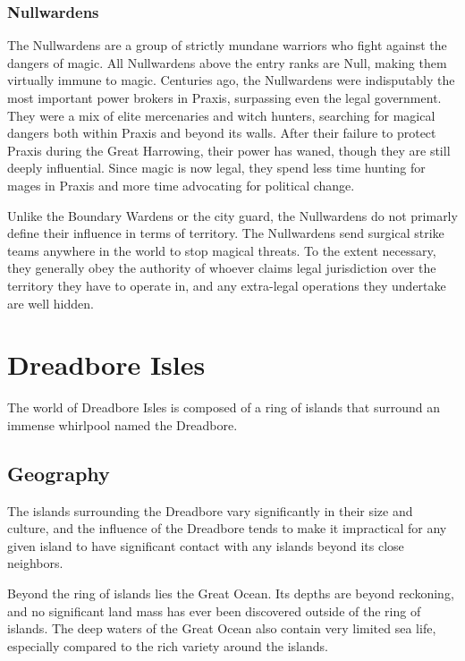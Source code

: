     \subsubsection{Nullwardens}
      The Nullwardens are a group of strictly mundane warriors who fight against the dangers of magic.
      All Nullwardens above the entry ranks are Null, making them virtually immune to magic.
      Centuries ago, the Nullwardens were indisputably the most important power brokers in Praxis, surpassing even the legal government.
      They were a mix of elite mercenaries and witch hunters, searching for magical dangers both within Praxis and beyond its walls.
      After their failure to protect Praxis during the Great Harrowing, their power has waned, though they are still deeply influential.
      Since magic is now legal, they spend less time hunting for mages in Praxis and more time advocating for political change.

      Unlike the Boundary Wardens or the city guard, the Nullwardens do not primarly define their influence in terms of territory.
      The Nullwardens send surgical strike teams anywhere in the world to stop magical threats.
      To the extent necessary, they generally obey the authority of whoever claims legal jurisdiction over the territory they have to operate in, and any extra-legal operations they undertake are well hidden.

\section{Dreadbore Isles}
  The world of Dreadbore Isles is composed of a ring of islands that surround an immense whirlpool named the Dreadbore.

  \subsection{Geography}
    The islands surrounding the Dreadbore vary significantly in their size and culture, and the influence of the Dreadbore tends to make it impractical for any given island to have significant contact with any islands beyond its close neighbors.

    Beyond the ring of islands lies the Great Ocean.
    Its depths are beyond reckoning, and no significant land mass has ever been discovered outside of the ring of islands.
    The deep waters of the Great Ocean also contain very limited sea life, especially compared to the rich variety around the islands.

